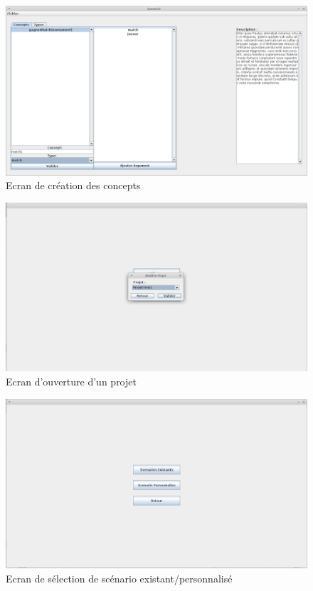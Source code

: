 \documentclass[12pt]{report}
\begin{document}
\begin{figure}
\centering
\includegraphics[scale=0.3]{IHM/creation_concepts.png}
\caption{Ecran de création des concepts}
\end{figure}

\begin{figure}
\centering
\includegraphics[scale=0.3]{IHM/selection_modifier_projet.png}
\caption{Ecran d'ouverture d'un projet}
\end{figure}

\begin{figure}
\centering
\includegraphics[scale=0.3]{IHM/choix_scenario.png}
\caption{Ecran de sélection de scénario existant/personnalisé}
\end{figure}
\end{document}

